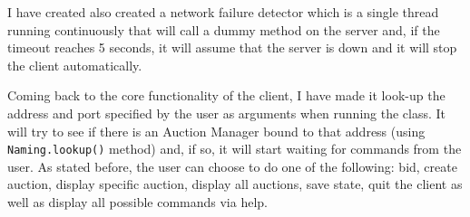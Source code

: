 \documentclass[11pt]{article}
\begin{document}
 I have created also created a network failure detector which is a single thread running continuously that will call a dummy method on the server and, if the timeout reaches 5 seconds, it will assume that the server is down and it will stop the client automatically.
 
 Coming back to the core functionality of the client, I have made it look-up the address and port specified by the user as arguments when running the class. It will try to see if there is an Auction Manager bound to that address (using \texttt{Naming.lookup()} method) and, if so, it will start waiting for commands from the user. As stated before, the user can choose to do one of the following: bid, create auction, display specific auction, display all auctions, save state, quit the client as well as display all possible commands via help.
\end{document}
